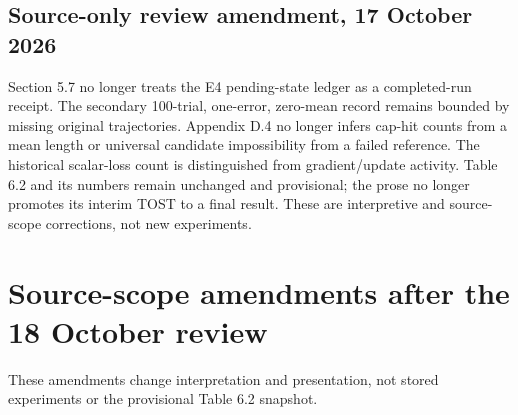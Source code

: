 \documentclass[12pt,a4paper]{report}
\begin{document}
\subsection{Source-only review amendment, 17 October
2026}\label{source-only-review-amendment-17-october-2026}

Section 5.7 no longer treats the E4 pending-state ledger as a
completed-run receipt. The secondary 100-trial, one-error, zero-mean
record remains bounded by missing original trajectories. Appendix D.4 no
longer infers cap-hit counts from a mean length or universal candidate
impossibility from a failed reference. The historical scalar-loss count
is distinguished from gradient/update activity. Table 6.2 and its
numbers remain unchanged and provisional; the prose no longer promotes
its interim TOST to a final result. These are interpretive and
source-scope corrections, not new experiments.

\section{Source-scope amendments after the 18 October
review}\label{source-scope-amendments-after-the-18-october-review}

These amendments change interpretation and presentation, not stored
experiments or the provisional Table 6.2 snapshot.
\end{document}
